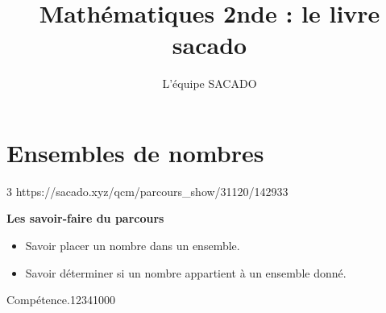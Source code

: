 



\title{Mathématiques 2nde  : le livre sacado}
\author{L'équipe SACADO}




\chapter{Ensembles de nombres}{3}
{https://sacado.xyz/qcm/parcours_show/31120/142933}
{
 \begin{CpsCol}
	\textbf{Les savoir-faire du parcours}
 	\begin{itemize}
 		\item Savoir placer un nombre dans un ensemble.
		\item Savoir déterminer si un nombre appartient à un ensemble donné.
 	\end{itemize}
 \end{CpsCol}

\begin{His}
\end{His}

\begin{ExoDec}{Compétence.}{1234}{1}{0}{0}{0}
\end{ExoDec}
}


